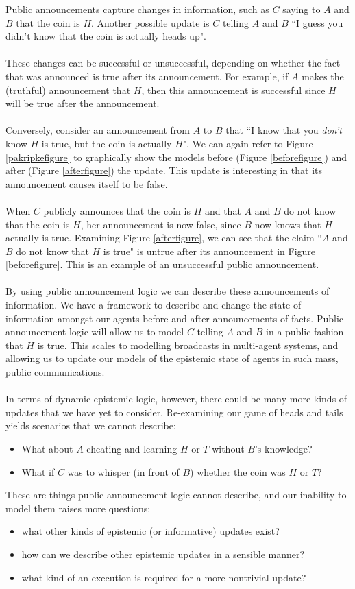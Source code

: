 Public announcements capture changes in information, such as $C$ saying to
$A$ and $B$ that the coin is $H$.
Another possible update is $C$ telling $A$ and $B$ ``I guess you didn't know that the coin is actually heads up".\\
\\
These changes can be successful or unsuccessful, depending on whether the fact
that was announced is true after its announcement.
For example, if $A$ makes the (truthful) announcement that $H$, then this
announcement is successful since $H$ will be true after the announcement.\\
\\
Conversely, consider an announcement from $A$ to $B$ that ``I know that you {\em don't} know $H$
is true, but the coin is actually $H$".
We can again refer to Figure \ref{pakripkefigure} to graphically show the models
before (Figure \ref{beforefigure}) and after (Figure \ref{afterfigure}) the update.
This update is interesting in that its announcement causes itself to be false.\\
\\
When $C$ publicly announces that the coin is $H$ and that $A$ and $B$ do not know that
the coin is $H$, her announcement is now false, since $B$ now knows that $H$
actually is true.
Examining Figure \ref{afterfigure}, we can see that the claim ``$A$ and $B$ do not know that $H$ is
true" is untrue after its announcement in Figure \ref{beforefigure}.
This is an example of an unsuccessful public announcement.\\
\\
By using public announcement logic we can describe these announcements of
information.
We have a framework to describe and change the state of information amongst our
agents before and after announcements of facts.
Public announcement logic will allow us to model $C$ telling $A$ and $B$ in a
public fashion that $H$ is true.
This scales to modelling broadcasts in multi-agent systems, and allowing us to
update our models of the epistemic state of agents in such mass, public communications.\\
\\
In terms of dynamic epistemic logic, however, there could be many more kinds of
updates that we have yet to consider.
Re-examining our game of heads and tails yields scenarios that we cannot
describe:
\begin{itemize}
	\item What about $A$ cheating and learning $H$ or $T$ without $B$'s knowledge?
	\item What if $C$ was to whisper (in front of $B$) whether the coin was $H$
	or $T$?
\end{itemize}
These are things public announcement logic cannot describe, and our inability to
model them raises more questions:
\begin{itemize}
	\item what other kinds of epistemic (or informative) updates exist?
	\item how can we describe other epistemic updates in a sensible manner?
	\item what kind of an execution is required for a more nontrivial update?
\end{itemize}

